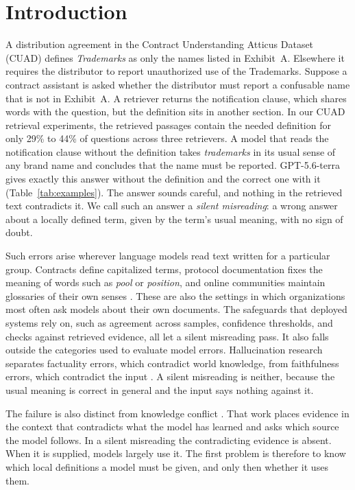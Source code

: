 \section{Introduction}
\label{sec:intro}
A distribution agreement in the Contract Understanding Atticus Dataset (CUAD) \citep{cuad} defines \emph{Trademarks} as only the names listed in Exhibit~A. Elsewhere it requires the distributor to report unauthorized use of the Trademarks. Suppose a contract assistant is asked whether the distributor must report a confusable name that is not in Exhibit~A. A retriever returns the notification clause, which shares words with the question, but the definition sits in another section. In our CUAD retrieval experiments, the retrieved passages contain the needed definition for only 29\% to 44\% of questions across three retrievers. A model that reads the notification clause without the definition takes \emph{trademarks} in its usual sense of any brand name and concludes that the name must be reported. GPT-5.6-terra gives exactly this answer without the definition and the correct one with it (Table~\ref{tab:examples}). The answer sounds careful, and nothing in the retrieved text contradicts it. We call such an answer a \emph{silent misreading}: a wrong answer about a locally defined term, given by the term's usual meaning, with no sign of doubt.

Such errors arise wherever language models read text written for a particular group. Contracts define capitalized terms, protocol documentation fixes the meaning of words such as \emph{pool} or \emph{position}, and online communities maintain glossaries of their own senses \citep{lucy-bamman-glossaries}. These are also the settings in which organizations most often ask models about their own documents. The safeguards that deployed systems rely on, such as agreement across samples, confidence thresholds, and checks against retrieved evidence, all let a silent misreading pass. It also falls outside the categories used to evaluate model errors. Hallucination research separates factuality errors, which contradict world knowledge, from faithfulness errors, which contradict the input \citep{space}. A silent misreading is neither, because the usual meaning is correct in general and the input says nothing against it.

The failure is also distinct from knowledge conflict \citep{longpre-etal-2021-entity,kc-survey,conflictbank,knowledge-conflict-faithfulness}. That work places evidence in the context that contradicts what the model has learned and asks which source the model follows. In a silent misreading the contradicting evidence is absent. When it is supplied, models largely use it. The first problem is therefore to know which local definitions a model must be given, and only then whether it uses them.

